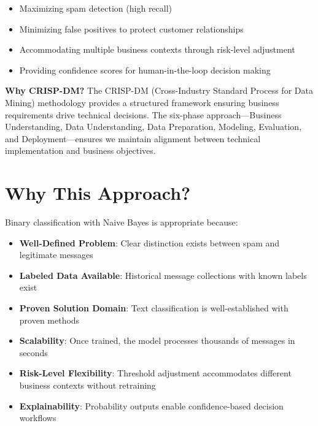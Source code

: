 \documentclass[12pt,a4paper]{article}
\begin{document}
\begin{itemize}
    \item Maximizing spam detection (high recall)
    \item Minimizing false positives to protect customer relationships
    \item Accommodating multiple business contexts through risk-level adjustment
    \item Providing confidence scores for human-in-the-loop decision making
\end{itemize}

\textbf{Why CRISP-DM?} The CRISP-DM (Cross-Industry Standard Process for Data Mining) methodology provides a structured framework ensuring business requirements drive technical decisions. The six-phase approach—Business Understanding, Data Understanding, Data Preparation, Modeling, Evaluation, and Deployment—ensures we maintain alignment between technical implementation and business objectives.

\section{Why This Approach?}

Binary classification with Naive Bayes is appropriate because:

\begin{itemize}
    \item \textbf{Well-Defined Problem}: Clear distinction exists between spam and legitimate messages
    \item \textbf{Labeled Data Available}: Historical message collections with known labels exist
    \item \textbf{Proven Solution Domain}: Text classification is well-established with proven methods
    \item \textbf{Scalability}: Once trained, the model processes thousands of messages in seconds
    \item \textbf{Risk-Level Flexibility}: Threshold adjustment accommodates different business contexts without retraining
    \item \textbf{Explainability}: Probability outputs enable confidence-based decision workflows
\end{itemize}

\end{document}
